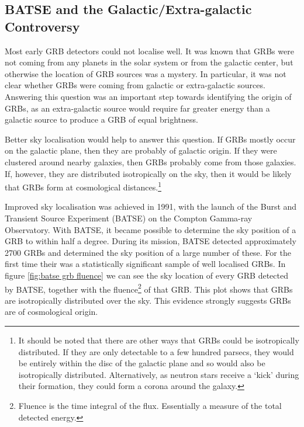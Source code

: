 \documentclass[11pt]{cuthesis}
\begin{document}
\subsection{BATSE and the Galactic/Extra-galactic Controversy}
Most early GRB detectors could not localise well. It was known that GRBs were not coming from any planets in the solar system or from the galactic center, but otherwise the location of GRB sources was a mystery. In particular, it was not clear whether GRBs were coming from galactic or extra-galactic sources. Answering this question was an important step towards identifying the origin of GRBs, as an extra-galactic source would require far greater energy than a galactic source to produce a GRB of equal brightness. 

Better sky localisation would help to answer this question. If GRBs mostly occur on the galactic plane, then they are probably of galactic origin. If they were clustered around nearby galaxies, then GRBs probably come from those galaxies. If, however, they are distributed isotropically on the sky, then it would be likely that GRBs form at cosmological distances.\footnote{It should be noted that there are other ways that GRBs could be isotropically distributed. If they are only detectable to a few hundred parsecs, they would be entirely within the disc of the galactic plane and so would also be isotropically distributed. Alternatively, as neutron stars receive a `kick' during their formation, they could form a corona around the galaxy.}

Improved sky localisation was achieved in 1991, with the launch of the Burst and Transient Source Experiment (BATSE) on the Compton Gamma-ray Observatory. With BATSE, it became possible to determine the sky position of a GRB to within half a degree. During its mission, BATSE detected approximately 2700 GRBs and determined the sky position of a large number of these. For the first time their was a statistically significant sample of well localised GRBs. In figure \ref{fig:batse grb fluence} we can see the sky location of every GRB detected by BATSE, together with the fluence\footnote{Fluence is the time integral of the flux. Essentially a measure of the total detected energy.} of that GRB. This plot shows that GRBs are isotropically distributed over the sky. This evidence strongly suggests GRBs are of cosmological origin. 
\end{document}
